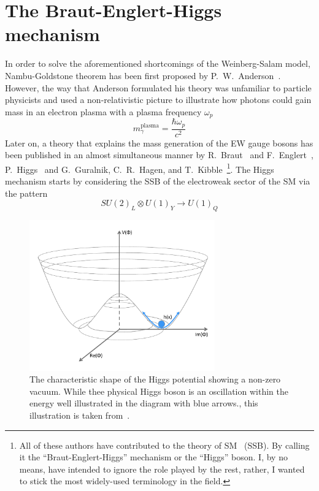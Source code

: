 \section{The Braut-Englert-Higgs mechanism \label{Higgsmech}}
In order to solve the aforementioned shortcomings of the Weinberg-Salam model, Nambu-Goldstone theorem has been first proposed by P.~W.~Anderson~\cite{PhysRev.130.439}. However, the way that Anderson formulated his theory was unfamiliar to particle physicists and used a non-relativistic picture to illustrate how photons could gain mass in an electron plasma with a plasma frequency $\omega_{p}$ 
\begin{equation}
    m_\gamma^{\mathrm{plasma}} =\frac{\hbar \omega_p}{c^2}
\end{equation}
Later on, a theory that explains the mass generation of the EW gauge bosons has been published in an almost simultaneous manner by R.~Braut~ and F.~Englert~\cite{PhysRevLett.13.321}, P.~Higgs~\cite{PhysRevLett.13.508,HIGGS1964132} and G.~Guralnik, C.~R.~Hagen, and T.~Kibble~\cite{PhysRevLett.13.585,Guralnik:2009jd}\footnote{All of these authors have contributed to the theory of SM ~(SSB). By calling it the ``Braut-Englert-Higgs'' mechanism or the ``Higgs'' boson. I, by no means, have intended to ignore the role played by the rest, rather, I wanted to stick the most widely-used terminology in the field.}.
The Higgs mechanism starts by considering the SSB of the electroweak sector of the SM via the pattern
\begin{equation}
    SU(2)_L \otimes U(1)_Y \longrightarrow U(1)_{Q} 
\end{equation}
\begin{figure}[t!]
	\begin{center}
		\includegraphics[width=8cm]{figures/HiggsPotential}
		\caption{The characteristic shape of the Higgs potential showing a non-zero vacuum. While thee physical Higgs boson is an oscillation within the energy well illustrated in the diagram with blue arrows., this illustration is taken from~\cite{Erler:2019hds}. \label{fig:higgs_hat} }
	\end{center}
\end{figure}
